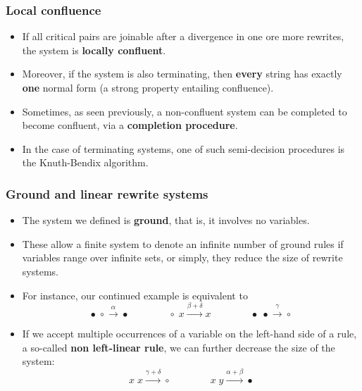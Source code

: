 \documentclass[compress,dvips,xcolor={dvipsnames},t]{beamer}
\begin{document}
\begin{frame}
  \frametitle{Local confluence}

  \begin{itemize}

    \item If all critical pairs are joinable after a divergence in one
      ore more rewrites, the system is \textbf{locally confluent}.

    \item Moreover, if the system is also terminating, then
      \textbf{every} string has exactly \textbf{one} normal form (a
      strong property entailing confluence).

    \item Sometimes, as seen previously, a non\hyp{}confluent system
      can be completed to become confluent, via a \textbf{completion
        procedure}.

      \item In the case of terminating systems, one of such
        semi\hyp{}decision procedures is the Knuth\hyp{}Bendix
        algorithm.
  \end{itemize}

\end{frame}

\begin{frame}
  \frametitle{Ground and linear rewrite systems}

  \begin{itemize}

    \item The system we defined is \textbf{ground}, that is, it
      involves no variables.

    \item These allow a finite system to denote an infinite number of
      ground rules if variables range over infinite sets, or simply,
      they reduce the size of rewrite systems.

    \item For instance, our continued example is equivalent to
      \begin{equation*}
        \bullet \; \circ \xrightarrow{\alpha} \bullet
        \qquad\qquad
        \circ \; x \xrightarrow{\beta+\delta} x
        \qquad\qquad
        \bullet \; \bullet \xrightarrow{\gamma} \circ
      \end{equation*}

    \item If we accept multiple occurrences of a variable on the
      left\hyp{}hand side of a rule, a so\hyp{}called \textbf{non
        left\hyp{}linear rule}, we can further decrease the size of
      the system:
      \begin{equation*}
        x  \; x \xrightarrow{\gamma+\delta} \circ\qquad\qquad
        x  \; y \xrightarrow{\alpha+\beta} \bullet
      \end{equation*}

  \end{itemize}
\end{frame}
\end{document}
